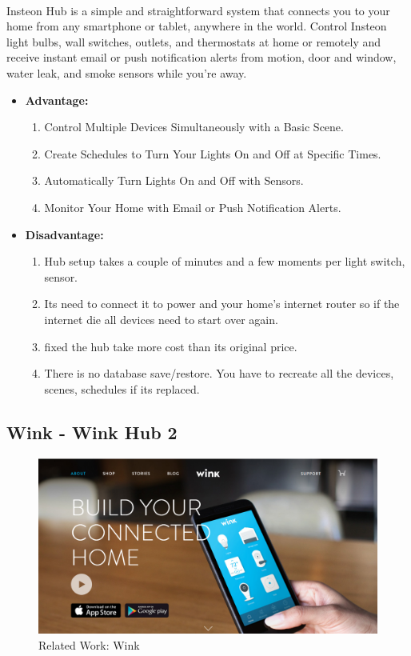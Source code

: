 \documentclass[12pt, oneside, a4paper]{book}
\newcommand\boldcolor[1]{\textcolor{bold}{\textbf{#1}}}
\begin{document}
		\paragraph{}Insteon Hub is a simple and straightforward system that connects you to your home from any smartphone or tablet, anywhere in the world. Control Insteon light bulbs, wall switches, outlets, and thermostats at home or remotely and receive instant email or push notification alerts from motion, door and window, water leak, and smoke sensors while you’re away\cite{insteon}.
		\begin{itemize}
		\item \boldcolor{Advantage:}
			\begin{enumerate}
				\item Control Multiple Devices Simultaneously with a Basic Scene.
				\item Create Schedules to Turn Your Lights On and Off at Specific Times.
				\item Automatically Turn Lights On and Off with Sensors.
				\item Monitor Your Home with Email or Push Notification Alerts.
			\end{enumerate}
		\item \boldcolor{Disadvantage:} 
			\begin{enumerate}
				\item Hub setup takes a couple of minutes and a few moments per light switch, sensor.
				\item Its need to connect it to power and your home's internet router so if the internet die all devices need to start over again. 
				\item fixed the hub take more cost than its original price.
				\item There is no database save/restore. You have to recreate all the devices, scenes, schedules if its replaced.
			\end{enumerate}
		\end{itemize}
		\newpage	
		\subsection{Wink - Wink Hub 2}
		\begin{figure}[H]
  			\caption{Related Work: Wink}
  			\includegraphics[width=\linewidth]{img/wink.png}
		\end{figure}
\end{document}
